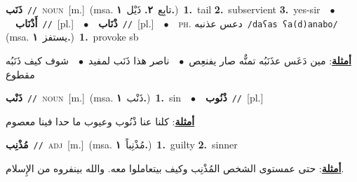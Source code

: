 \documentclass[10pt,a4paper,twoside]{article} %
\begin{document}
\begin{multicols}{2}
{\setlength\topsep{0pt}\textbf{\foreignlanguage{arabic}{ذَنَب}}\ {\color{gray}\texttt{//}\color{black}}\ \textsc{noun}\ [m.]\ \color{gray}(msa. \foreignlanguage{arabic}{تابِع}~\foreignlanguage{arabic}{\textbf{٢.}}  \foreignlanguage{arabic}{ذَيْل}~\foreignlanguage{arabic}{\textbf{١.}})\color{black}\ \textbf{1.}~tail  \textbf{2.}~subservient  \textbf{3.}~yes-sir\ \ $\bullet$\ \ \setlength\topsep{0pt}\textbf{\foreignlanguage{arabic}{أَذْنَاب}}\ {\color{gray}\texttt{//}\color{black}}\ [pl.]\ \ $\bullet$\ \ \setlength\topsep{0pt}\textbf{\foreignlanguage{arabic}{ذْنَاب}}\ {\color{gray}\texttt{//}\color{black}}\ [pl.]\ \ $\bullet$\ \ \textsc{ph.} \color{gray} \foreignlanguage{arabic}{دعس عذنبه}\color{black}\ {\color{gray}\texttt{/{\sffamily daʕas ʕa(d)anabo}/}\color{black}}\ \color{gray} (msa. \foreignlanguage{arabic}{يستفز}~\foreignlanguage{arabic}{\textbf{١.}})\color{black}\ \textbf{1.}~provoke sb\  \begin{flushright}\color{gray}\foreignlanguage{arabic}{\textbf{\underline{\foreignlanguage{arabic}{أمثلة}}}: مين دَعَس عذَنَبُه تمنٌّه صار يفنعِص\ $\bullet$\ \  ناصر هذا ذَنَب لمفيد\ $\bullet$\ \  شوف كيف ذَنَبُه مقطوع}\end{flushright}\color{black}} \vspace{2mm}

{\setlength\topsep{0pt}\textbf{\foreignlanguage{arabic}{ذَنْب}}\ {\color{gray}\texttt{//}\color{black}}\ \textsc{noun}\ [m.]\ \color{gray}(msa. \foreignlanguage{arabic}{ذَنْب}~\foreignlanguage{arabic}{\textbf{١.}})\color{black}\ \textbf{1.}~sin\ \ $\bullet$\ \ \setlength\topsep{0pt}\textbf{\foreignlanguage{arabic}{ذْنُوب}}\ {\color{gray}\texttt{//}\color{black}}\ [pl.]\  \begin{flushright}\color{gray}\foreignlanguage{arabic}{\textbf{\underline{\foreignlanguage{arabic}{أمثلة}}}: كلنا عنا ذْنُوب وعيوب ما حدا فينا معصوم}\end{flushright}\color{black}} \vspace{2mm}

{\setlength\topsep{0pt}\textbf{\foreignlanguage{arabic}{مُذْنِب}}\ {\color{gray}\texttt{//}\color{black}}\ \textsc{adj}\ [m.]\ \color{gray}(msa. \foreignlanguage{arabic}{مُذْنِباً}~\foreignlanguage{arabic}{\textbf{١.}})\color{black}\ \textbf{1.}~guilty  \textbf{2.}~sinner\  \begin{flushright}\color{gray}\foreignlanguage{arabic}{\textbf{\underline{\foreignlanguage{arabic}{أمثلة}}}: حتى عمستوى الشخص المُذْنِب وكيف بيتعاملوا معه. والله بينفروه من الإِسلام.}\end{flushright}\color{black}} \vspace{2mm}


\end{multicols}
\end{document}
